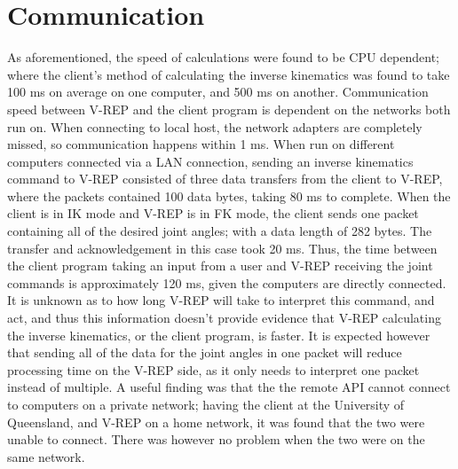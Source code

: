 \documentclass[12pt,openany,a4paper]{book}
\newcommand{\fig}[1]  {Fig.\,\ref{#1}}		%
\begin{document}
\section{Communication}
As aforementioned, the speed of calculations were found to be CPU dependent; where the client's method of calculating the inverse kinematics was found to take 100 ms on average on one computer, and 500 ms on another. Communication speed between V-REP and the client program is dependent on the networks both run on. When connecting to local host, the network adapters are completely missed, so communication happens within 1 ms. When run on different computers connected via a LAN connection, sending an inverse kinematics command to V-REP consisted of three data transfers from the client to V-REP, where the packets contained 100 data bytes, taking 80 ms to complete. When the client is in IK mode and V-REP is in FK mode, the client sends one packet containing all of the desired joint angles; with a data length of 282 bytes. The transfer and acknowledgement in this case took 20 ms. Thus, the time between the client program taking an input from a user and V-REP receiving the joint commands is approximately 120 ms, given the computers are directly connected. It is unknown as to how long V-REP will take to interpret this command, and act, and thus this information doesn't provide evidence that V-REP calculating the inverse kinematics, or the client program, is faster. It is expected however that sending all of the data for the joint angles in one packet will reduce processing time on the V-REP side, as it only needs to interpret one packet instead of multiple. A useful finding was that the the remote API cannot connect to computers on a private network; having the client at the University of Queensland, and V-REP on a home network, it was found that the two were unable to connect. There was however no problem when the two were on the same network.

%
\end{document}
